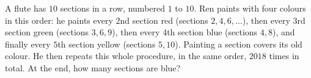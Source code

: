 A flute has $10$ sections in a row, numbered $1$ to $10$. Ren paints with four colours in this order: he paints every $2$nd section red (sections $2,4,6,\dots$), then every $3$rd section green (sections $3,6,9$), then every $4$th section blue (sections $4,8$), and finally every $5$th section yellow (sections $5,10$). Painting a section covers its old colour. He then repeats this whole procedure, in the same order, $2018$ times in total. At the end, how many sections are blue?
